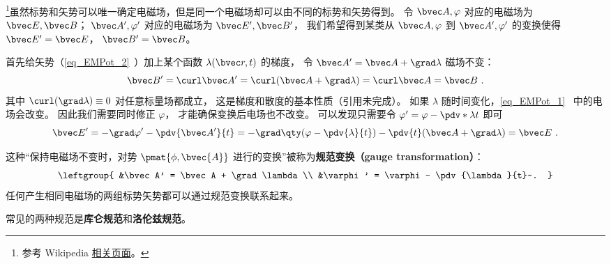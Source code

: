 
\begin{issues}
\issueDraft
\end{issues}


\footnote{参考 Wikipedia \href{https://en.wikipedia.org/wiki/Gauge_fixing}{相关页面}。}虽然标势和矢势可以唯一确定电磁场，但是同一个电磁场却可以由不同的标势和矢势得到。 令 $\bvec A, \varphi$ 对应的电磁场为 $\bvec E, \bvec B$； $\bvec A', \varphi'$ 对应的电磁场为 $\bvec E', \bvec B'$， 我们希望得到某类从 $\bvec A, \varphi$ 到 $\bvec A', \varphi'$ 的变换使得 $\bvec E' = \bvec E$， $\bvec B' = \bvec B$。

首先给矢势（\autoref{eq_EMPot_2}~）加上某个函数 $\lambda(\bvec r, t)$ 的梯度， 令 $\bvec A' = \bvec A + \grad\lambda$ 磁场不变：
\begin{equation}
\bvec B' = \curl \bvec A' = \curl (\bvec A + \grad \lambda) = \curl \bvec A = \bvec B~.
\end{equation}
其中 $\curl(\grad \lambda) \equiv 0$ 对任意标量场都成立， 这是梯度和散度的基本性质（引用未完成）。 如果 $\lambda$ 随时间变化，\autoref{eq_EMPot_1}~ 中的电场会改变。 因此我们需要同时修正 $\varphi$， 才能确保变换后电场也不改变。 可以发现只需要令 $\varphi' = \varphi - \pdv*{\lambda}{t}$ 即可
\begin{equation}
\bvec E' = -\grad \varphi' - \pdv{\bvec A'}{t} = -\grad \qty(\varphi - \pdv{\lambda}{t}) - \pdv{t} (\bvec A + \grad \lambda) = \bvec E~.
\end{equation}


这种“保持电磁场不变时，对势 $\pmat{\phi, \bvec{A}}$ 进行的变换”被称为\textbf{规范变换（gauge transformation）}：
\begin{equation}\label{eq_Gauge_3}
\leftgroup{
&\bvec A' = \bvec A + \grad \lambda\\
&\varphi' = \varphi - \pdv{\lambda}{t}~.
}\end{equation}
任何产生相同电磁场的两组标势矢势都可以通过规范变换联系起来。

常见的两种规范是\textbf{库仑规范}和\textbf{洛伦兹规范}。
